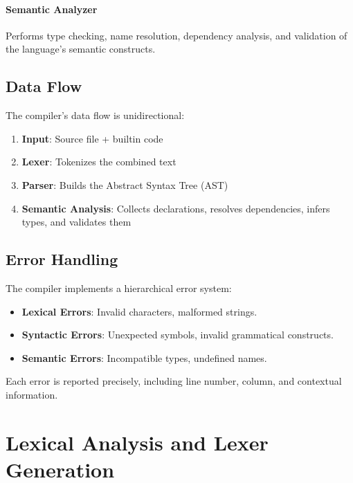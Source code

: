 \documentclass[12pt,a4paper]{report}
\begin{document}
\subsubsection{Semantic Analyzer}

Performs type checking, name resolution, dependency analysis, and validation of the language's semantic constructs.

\section{Data Flow}

The compiler's data flow is unidirectional:

\begin{enumerate}
    \item \textbf{Input}: Source file + builtin code
    \item \textbf{Lexer}: Tokenizes the combined text
    \item \textbf{Parser}: Builds the Abstract Syntax Tree (AST)
    \item \textbf{Semantic Analysis}: Collects declarations, resolves dependencies, infers types, and validates them
\end{enumerate}

\section{Error Handling}

The compiler implements a hierarchical error system:

\begin{itemize}
    \item \textbf{Lexical Errors}: Invalid characters, malformed strings.
    \item \textbf{Syntactic Errors}: Unexpected symbols, invalid grammatical constructs.
    \item \textbf{Semantic Errors}: Incompatible types, undefined names.
\end{itemize}

Each error is reported precisely, including line number, column, and contextual information.
\chapter{Lexical Analysis and Lexer Generation}
\end{document}
